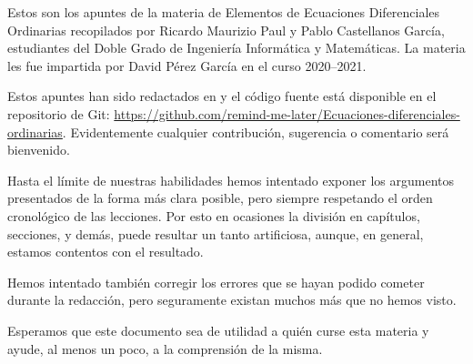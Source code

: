 \documentclass[ecuaciones_diferenciales.tex]{subfiles}
\begin{document}
Estos son los apuntes de la materia de Elementos de Ecuaciones Diferenciales 
Ordinarias recopilados por Ricardo Maurizio Paul y Pablo Castellanos
García, estudiantes del Doble Grado de Ingeniería Informática y Matemáticas. La
materia les fue impartida por David Pérez García en el curso 2020--2021.

Estos apuntes han sido redactados en  y el código fuente 
está disponible en el repositorio de Git:
\url{https://github.com/remind-me-later/Ecuaciones-diferenciales-ordinarias}.
Evidentemente cualquier contribución, sugerencia o comentario será bienvenido.

Hasta el límite de nuestras habilidades hemos intentado exponer los argumentos 
presentados de la forma más clara posible, pero siempre respetando el orden
cronológico de las lecciones. Por esto en ocasiones la división en capítulos,
secciones, y demás, puede resultar un tanto artificiosa, aunque, en general,
estamos contentos con el resultado.

Hemos intentado también corregir los errores que se hayan podido cometer durante
la redacción, pero seguramente existan muchos más que no hemos visto.

Esperamos que este documento sea de utilidad a quién curse esta materia y ayude,
al menos un poco, a la comprensión de la misma.
\end{document}
